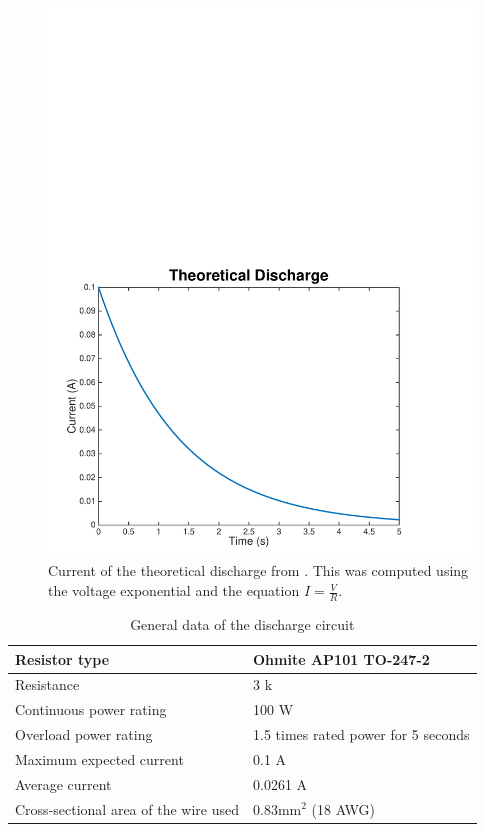 \documentclass{article}
\begin{document}
\begin{figure}[H]
    \centering
    \includegraphics[width = 0.7 \textwidth]{discharge_current}
    \caption{Current of the theoretical discharge from . This was computed using the voltage exponential and the equation $I = \frac{V}{R}$.}
    \label{fig:discharge_current}
\end{figure}

	\begin{table}[H]
		\centering
		\begin{tabular}{|l|l|}
		\hline
		Resistor type & Ohmite AP101 TO-247-2 \\ \hline
		Resistance & 3 k\ohm \\ \hline
		Continuous power rating & 100 W \\ \hline
		Overload power rating & 1.5 times rated power for 5 seconds \\ \hline
		Maximum expected current & 0.1 A \\ \hline
		Average current & 0.0261 A\\ \hline
		Cross-sectional area of the wire used & 0.83mm$^2$ (18 AWG) \\ \hline
		\end{tabular}
		\caption{General data of the discharge circuit}
		\label{dctable}
	\end{table}
\end{document}

